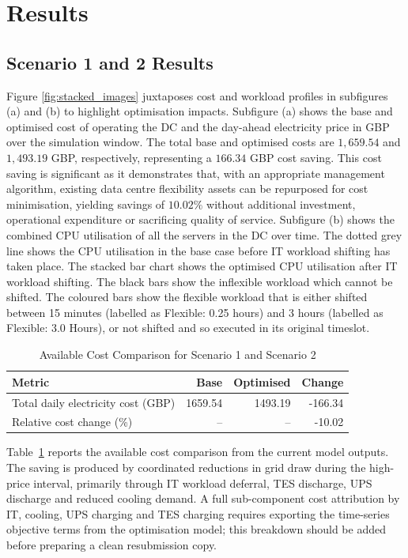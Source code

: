 \documentclass[lettersize,journal]{IEEEtran}
\newcommand{\rev}[1]{\textcolor{blue!70!black}{#1}}
\begin{document}
\section{Results}

\subsection{Scenario 1 and 2 Results}
Figure \ref{fig:stacked_images} juxtaposes cost and workload profiles in subfigures (a) and (b) to highlight optimisation impacts. Subfigure (a) shows the base and optimised cost of operating the DC and the day-ahead electricity price in GBP over the simulation window. The total base and optimised costs are $1,659.54$ and $1,493.19$ GBP, respectively, representing a $ 166.34$ GBP cost saving. This cost saving is significant as it demonstrates that, with an appropriate management algorithm, existing data centre flexibility assets can be repurposed for cost minimisation, yielding savings of $10.02\%$ without additional investment, operational expenditure or sacrificing quality of service. Subfigure (b) shows the combined CPU utilisation of all the servers in the DC over time. The dotted grey line shows the CPU utilisation in the base case before IT workload shifting has taken place. The stacked bar chart shows the optimised CPU utilisation after IT workload shifting. The black bars show the inflexible workload which cannot be shifted. The coloured bars show the flexible workload that is either shifted between 15 minutes (labelled as Flexible: 0.25 hours) and 3 hours (labelled as Flexible: 3.0 Hours), or not shifted and so executed in its original timeslot. 

\begin{table}[!t]
\centering
\caption{\rev{Available Cost Comparison for Scenario 1 and Scenario 2}}
\label{tab:cost-comparison}
\begin{scriptsize}
\begin{tabular}{lrrr}
\toprule
\textbf{Metric} & \textbf{Base} & \textbf{Optimised} & \textbf{Change} \\
\midrule
Total daily electricity cost (GBP) & 1659.54 & 1493.19 & -166.34 \\
Relative cost change (\%) & -- & -- & -10.02 \\
\bottomrule
\end{tabular}
\end{scriptsize}
\end{table}

\rev{Table~\ref{tab:cost-comparison} reports the available cost comparison from the current model outputs. The saving is produced by coordinated reductions in grid draw during the high-price interval, primarily through IT workload deferral, TES discharge, UPS discharge and reduced cooling demand. A full sub-component cost attribution by IT, cooling, UPS charging and TES charging requires exporting the time-series objective terms from the optimisation model; this breakdown should be added before preparing a clean resubmission copy.}
\end{document}
